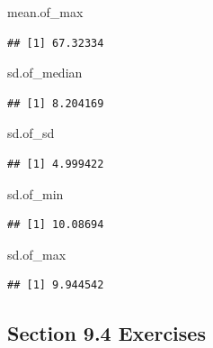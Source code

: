 \documentclass[
]{article}
\newenvironment{Shaded}{\begin{snugshade}}{\end{snugshade}}
\newcommand{\NormalTok}[1]{#1}
\begin{document}
\begin{Shaded}
\begin{Highlighting}[]
\NormalTok{mean.of\_max}
\end{Highlighting}
\end{Shaded}

\begin{verbatim}
## [1] 67.32334
\end{verbatim}

\begin{Shaded}
\begin{Highlighting}[]
\NormalTok{sd.of\_median}
\end{Highlighting}
\end{Shaded}

\begin{verbatim}
## [1] 8.204169
\end{verbatim}

\begin{Shaded}
\begin{Highlighting}[]
\NormalTok{sd.of\_sd}
\end{Highlighting}
\end{Shaded}

\begin{verbatim}
## [1] 4.999422
\end{verbatim}

\begin{Shaded}
\begin{Highlighting}[]
\NormalTok{sd.of\_min}
\end{Highlighting}
\end{Shaded}

\begin{verbatim}
## [1] 10.08694
\end{verbatim}

\begin{Shaded}
\begin{Highlighting}[]
\NormalTok{sd.of\_max}
\end{Highlighting}
\end{Shaded}

\begin{verbatim}
## [1] 9.944542
\end{verbatim}

\hypertarget{section-9.4-exercises}{%
\subsection{Section 9.4 Exercises}\label{section-9.4-exercises}}
\end{document}
